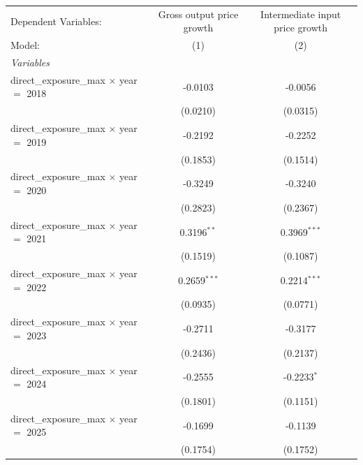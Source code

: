 \begingroup
\centering
\begin{tabular}{lcc}
   \tabularnewline \midrule \midrule
   Dependent Variables:                            & Gross output price growth & Intermediate input price growth\\  
   Model:                                          & (1)                       & (2)\\  
   \midrule
   \emph{Variables}\\
   direct\_exposure\_max $\times$ year $=$ 2018    & -0.0103                   & -0.0056\\   
                                                   & (0.0210)                  & (0.0315)\\   
   direct\_exposure\_max $\times$ year $=$ 2019    & -0.2192                   & -0.2252\\   
                                                   & (0.1853)                  & (0.1514)\\   
   direct\_exposure\_max $\times$ year $=$ 2020    & -0.3249                   & -0.3240\\   
                                                   & (0.2823)                  & (0.2367)\\   
   direct\_exposure\_max $\times$ year $=$ 2021    & 0.3196$^{**}$             & 0.3969$^{***}$\\   
                                                   & (0.1519)                  & (0.1087)\\   
   direct\_exposure\_max $\times$ year $=$ 2022    & 0.2659$^{***}$            & 0.2214$^{***}$\\   
                                                   & (0.0935)                  & (0.0771)\\   
   direct\_exposure\_max $\times$ year $=$ 2023    & -0.2711                   & -0.3177\\   
                                                   & (0.2436)                  & (0.2137)\\   
   direct\_exposure\_max $\times$ year $=$ 2024    & -0.2555                   & -0.2233$^{*}$\\   
                                                   & (0.1801)                  & (0.1151)\\   
   direct\_exposure\_max $\times$ year $=$ 2025    & -0.1699                   & -0.1139\\   
                                                   & (0.1754)                  & (0.1752)\\   

\end{tabular}

